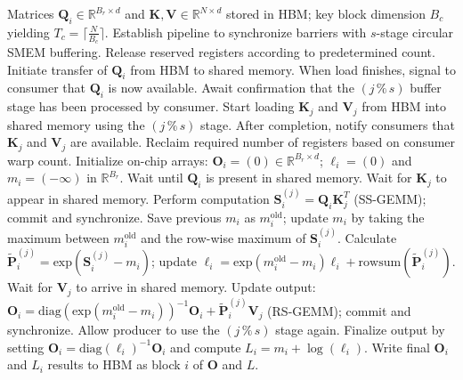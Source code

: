 \begin{algorithm}[H]
    \caption{\small\label{alg:flash3_wgmma_ws_only}\textsc{FlashAttention-3} forward pass \textbf{without} intra-consumer overlap -- CTA perspective}
    \begin{algorithmic}[1]
\REQUIRE Matrices $\mathbf{Q}_i \in \mathbb{R}^{B_r \times d}$ and $\mathbf{K}, \mathbf{V} \in \mathbb{R}^{N \times d}$ stored in HBM; key block dimension $B_c$ yielding $T_c = \lceil \frac{N}{B_c} \rceil$.
\STATE Establish pipeline to synchronize barriers with $s$-stage circular SMEM buffering.
\STATE Release reserved registers according to predetermined count.
\STATE Initiate transfer of $\mathbf{Q}_i$ from HBM to shared memory.
\STATE When load finishes, signal to consumer that $\mathbf{Q}_i$ is now available.
    \STATE Await confirmation that the $(j\,\%\,s)$ buffer stage has been processed by consumer.
    \STATE Start loading $\mathbf{K}_j$ and $\mathbf{V}_j$ from HBM into shared memory using the $(j\,\%\,s)$ stage.
    \STATE After completion, notify consumers that $\mathbf{K}_j$ and $\mathbf{V}_j$ are available.
\ENDFOR
\ELSE \STATE Reclaim required number of registers based on consumer warp count.
\STATE Initialize on-chip arrays: $\mathbf{O}_i = (0) \in \mathbb{R}^{B_r \times d}$; $\ell_i = (0)$ and $m_i = (-\infty)$ in $\mathbb{R}^{B_r}$.
\STATE Wait until $\mathbf{Q}_i$ is present in shared memory.
\STATE Wait for $\mathbf{K}_j$ to appear in shared memory.
\STATE Perform computation $\mathbf{S}_i^{(j)} = \mathbf{Q}_i \mathbf{K}_j^T$ (SS-GEMM); commit and synchronize. \label{alg:ws_only_gemm1}
\STATE Save previous $m_i$ as $m_i^{\mathrm{old}}$; update $m_i$ by taking the maximum between $m_i^{\mathrm{old}}$ and the row-wise maximum of $\mathbf{S}_i^{(j)}$. \label{code-ws:softmax_start}
\STATE Calculate $\widetilde{\mathbf{P}}_i^{(j)} = \mathrm{exp}(\mathbf{S}_i^{(j)} - m_i)$; update $\ell_i = \mathrm{exp}(m_i^{\mathrm{old}} - m_i) \ell_i + \mathrm{rowsum}(\widetilde{\mathbf{P}}_i^{(j)})$. \label{code-ws:softmax_end}
\STATE Wait for $\mathbf{V}_j$ to arrive in shared memory.
\STATE Update output: $\mathbf{O}_i = \mathrm{diag}(\mathrm{exp}(m_i^{\mathrm{old}} - m_i))^{-1} \mathbf{O}_i + \widetilde{\mathbf{P}}_i^{(j)} \mathbf{V}_j$ (RS-GEMM); commit and synchronize. \label{alg:ws_only_gemm2}
\STATE Allow producer to use the $(j\,\%\,s)$ stage again.
\ENDFOR
\STATE Finalize output by setting $\mathbf{O}_i = \mathrm{diag}(\ell_i)^{-1} \mathbf{O}_i$ and compute $L_i = m_i + \log(\ell_i)$.
\STATE Write final $\mathbf{O}_i$ and $L_i$ results to HBM as block $i$ of $\mathbf{O}$ and $L$.
\ENDIF
\end{algorithmic}
\end{algorithm}

